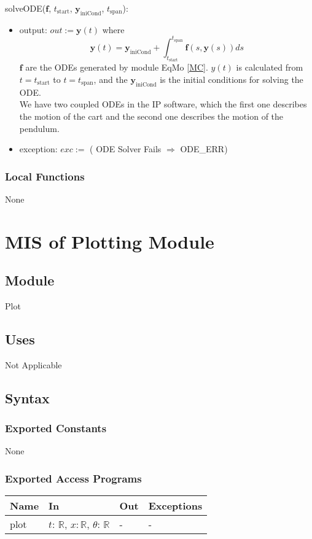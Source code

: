 \documentclass[12pt, titlepage]{article}
\begin{document}
\noindent solveODE($\textbf{f}$, $t_\text{start}$, $\textbf{y}_\text{iniCond}$, $t_\text{span}$): 
\begin{itemize}
\item output: $out := \textbf{y}(t)$ where 
$$\textbf{y}(t) = \textbf{y}_\text{iniCond} + \int_{t_\text{start}}^{t_\text{span}} \textbf{f}(s, \textbf{y}(s)) ds$$ 
 $\textbf{f}$ are the ODEs generated by module EqMo \ref{MC}. $y(t)$ is calculated from $t = t_\text{start}$ to $t = t_\text{span}$, and the $\textbf{y}_\text{iniCond}$ is the initial conditions for solving the ODE.\\
We have two coupled ODEs in the IP software, which the first one describes the motion of the cart and the second one describes the motion of the pendulum.

\item exception: $exc :=$ ( ODE Solver Fails $\Rightarrow$ ODE\_ERR)
\end{itemize}

\subsubsection{Local Functions}
None
\newpage


\section{MIS of Plotting Module \label{MPlot}}


\subsection{Module}
Plot
\subsection{Uses}
Not Applicable

\subsection{Syntax}

\subsubsection{Exported Constants}
None
\subsubsection{Exported Access Programs}
\begin{center}
\begin{tabular}{p{2cm} p{4cm} p{2cm} p{2cm}}
\hline
\textbf{Name} & \textbf{In} & \textbf{Out} & \textbf{Exceptions} \\
\hline
plot & $t$: $\mathbb{R}$, $x$$: \mathbb{R}$, $\theta$: $\mathbb{R}$ & - & - \\
\hline
\end{tabular}
\end{center}
\end{document}
